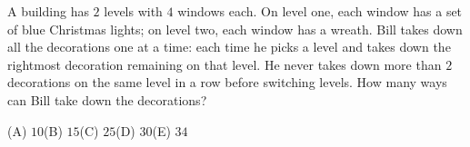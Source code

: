 A building has $2$ levels with $4$ windows each. On level one, each window has a set of blue Christmas lights; on level two, each window has a wreath. Bill takes down all the decorations one at a time: each time he picks a level and takes down the rightmost decoration remaining on that level. He never takes down more than $2$ decorations on the same level in a row before switching levels. How many ways can Bill take down the decorations?

(A) $10$\qquad (B) $15$\qquad (C) $25$\qquad (D) $30$\qquad (E) $34$
